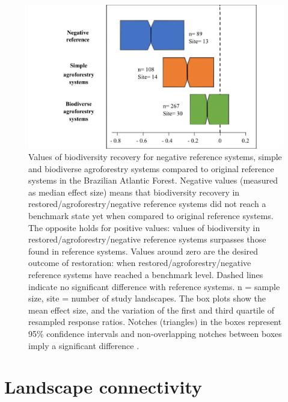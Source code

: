 \newpage
\begin{figure}[H]
\includegraphics[width=1.0\linewidth]{pictureve/Bio-Renatinho-1.pdf}
\caption{Values of biodiversity recovery for negative reference systems, simple and biodiverse agroforestry systems compared to original reference systems in the Brazilian Atlantic Forest. Negative values (measured as median effect size) means that biodiversity recovery in restored/agroforestry/negative reference systems did not reach a benchmark state yet when compared to original reference systems. The opposite holds for positive values: values of biodiversity in restored/agroforestry/negative reference systems surpasses those found in reference systems. Values around zero are the desired outcome of restoration: when restored/agroforestry/negative reference systems have reached a benchmark level. Dashed lines indicate no significant difference with reference systems. n = sample size, site = number of study landscapes. The box plots show the mean effect size, and the variation of the first and third quartile of resampled response ratios. Notches (triangles) in the boxes represent 95\% confidence intervals and non-overlapping notches between boxes imply a significant difference \citep{Crouzeilles2016a}.}
\label{fig:Bio-Renatinho-1}
\end{figure}



\section{\Large Landscape connectivity }\label{sec:bio-connect}

